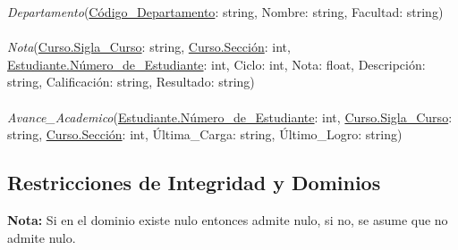 \documentclass[12pt]{article}
\begin{document}
\textit{Departamento}(\underline{Código\_Departamento}: string, Nombre: string, Facultad: string) \\\\
\textit{Nota}(\underline{Curso.Sigla\_Curso}: string, \underline{Curso.Sección}: int, \underline{Estudiante.Número\_de\_Estudiante}: int, Ciclo: int, Nota: float, Descripción: string, Calificación: string, Resultado: string) \\\\
\textit{Avance\_Academico}(\underline{Estudiante.Número\_de\_Estudiante}: int, \underline{Curso.Sigla\_Curso}: string, \underline{Curso.Sección}: int, Última\_Carga: string, Último\_Logro: string)

\subsection*{Restricciones de Integridad y Dominios}
\textbf{Nota:} Si en el dominio existe nulo entonces admite nulo, si no, se asume que no admite nulo.\\\\
\end{document}

